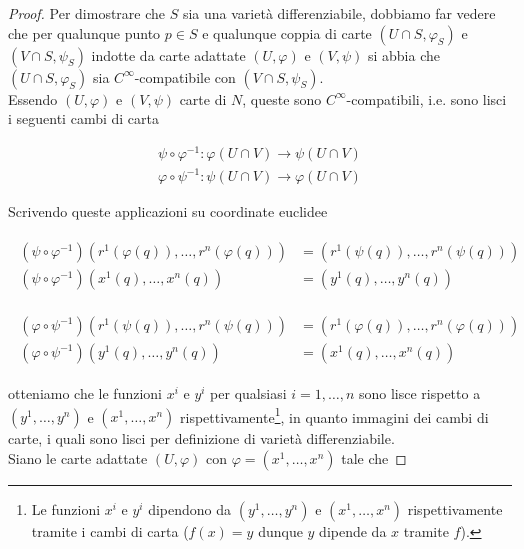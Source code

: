 \begin{proof}
	Per dimostrare che $ S $ sia una varietà differenziabile, dobbiamo far vedere che per qualunque punto $ p \in S $ e qualunque coppia di carte $ (U \cap S,\varphi_{S}) $ e $ (V \cap S,\psi_{S}) $ indotte da carte adattate $ (U,\varphi) $ e $ (V,\psi) $ si abbia che $ (U \cap S,\varphi_{S}) $ sia $ C^{\infty} $-compatibile con $ (V \cap S,\psi_{S}) $. \\
	Essendo $ (U,\varphi) $ e $ (V,\psi) $ carte di $ N $, queste sono $ C^{\infty} $-compatibili, i.e. sono lisci i seguenti cambi di carta
	
	\begin{gather}
		\psi \circ \varphi^{-1} : \varphi(U \cap V) \to \psi(U \cap V) \\
		\varphi \circ \psi^{-1} : \psi(U \cap V) \to \varphi(U \cap V)
	\end{gather}

	Scrivendo queste applicazioni su coordinate euclidee
	
	\begin{align}
		\begin{split}
			(\psi \circ \varphi^{-1}) \left( r^{1}(\varphi(q)),\dots,r^{n}(\varphi(q)) \right) &= \left( r^{1}(\psi(q)),\dots,r^{n}(\psi(q)) \right) \\
			(\psi \circ \varphi^{-1}) \left( x^{1}(q),\dots,x^{n}(q) \right) &= \left( y^{1}(q),\dots,y^{n}(q) \right)
		\end{split}
	\end{align}

	\begin{align}
		\begin{split}
			(\varphi \circ \psi^{-1}) \left( r^{1}(\psi(q)),\dots,r^{n}(\psi(q)) \right) &= \left( r^{1}(\varphi(q)),\dots,r^{n}(\varphi(q)) \right) \\
			(\varphi \circ \psi^{-1}) \left( y^{1}(q),\dots,y^{n}(q) \right) &= \left( x^{1}(q),\dots,x^{n}(q) \right)
		\end{split}
	\end{align}

	otteniamo che le funzioni $ x^{i} $ e $ y^{i} $ per qualsiasi $ i=1,\dots,n $ sono lisce rispetto a $ (y^{1},\dots,y^{n}) $ e $ (x^{1},\dots,x^{n}) $ rispettivamente\footnote{%
		Le funzioni $ x^{i} $ e $ y^{i} $ dipendono da $ (y^{1},\dots,y^{n}) $ e $ (x^{1},\dots,x^{n}) $ rispettivamente tramite i cambi di carta ($ f(x) = y $ dunque $ y $ dipende da $ x $ tramite $ f $).%
	}, in quanto immagini dei cambi di carte, i quali sono lisci per definizione di varietà differenziabile. \\
	Siano le carte adattate $ (U,\varphi) $ con $ \varphi = (x^{1},\dots,x^{n}) $ tale che
	

\end{proof}
